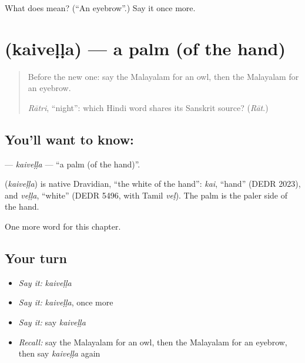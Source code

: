 \begin{tcolorbox}[breakable,colback=teal!4,colframe=teal!35!black,title={Before you move on}]
What does  mean? (\textquotedblleft{}An eyebrow\textquotedblright{}.) Say it once more.
\end{tcolorbox}
\section[\texorpdfstring{\ml{കൈവെള്ള} (kaiveḷḷa)}{കൈവെള്ള (kaiveḷḷa)}]{ (kaiveḷḷa) — a palm (of the hand)}

\label{lesson:ML-C163-kaivella}



\begin{quote}
Before the new one: say the Malayalam for an owl, then the Malayalam for an eyebrow.

\emph{Rātri}, \textquotedblleft{}night\textquotedblright{}: which Hindi word shares its Sanskrit source? (\emph{Rāt}.)
\end{quote}

\subsection*{You'll want to know: }
\textbf{} — \emph{kaiveḷḷa} — \textquotedblleft{}a palm (of the hand)\textquotedblright{}.

\begin{cousinweb}
\textbf{} (\emph{kaiveḷḷa}) is native Dravidian, \textquotedblleft{}the white of the hand\textquotedblright{}: \emph{kai}, \textquotedblleft{}hand\textquotedblright{} (DEDR 2023), and \emph{veḷḷa}, \textquotedblleft{}white\textquotedblright{} (DEDR 5496, with Tamil \emph{veḷ}). The palm is the paler side of the hand.
\end{cousinweb}

\begin{grammarlens}[title={What you've built}]
One more word for this chapter.
\end{grammarlens}

\subsection*{Your turn}
\begin{itemize}
\raggedright
  \item \emph{Say it:} \emph{kaiveḷḷa}
  \item \emph{Say it:} \emph{kaiveḷḷa}, once more
  \item \emph{Say it:} say \emph{kaiveḷḷa}
  \item \emph{Recall:} say the Malayalam for an owl, then the Malayalam for an eyebrow, then say \emph{kaiveḷḷa} again
\end{itemize}

